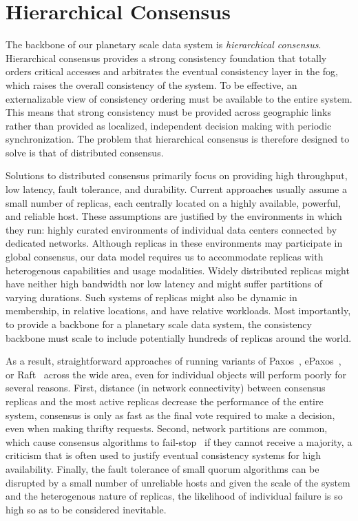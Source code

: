 
\renewcommand{\thechapter}{3}

\chapter{Hierarchical Consensus}

The backbone of our planetary scale data system is \emph{hierarchical consensus}.
Hierarchical consensus provides a strong consistency foundation that totally orders critical accesses and arbitrates the eventual consistency layer in the fog, which raises the overall consistency of the system.
To be effective, an externalizable view of consistency ordering must be available to the entire system.
This means that strong consistency must be provided across geographic links rather than provided as localized, independent decision making with periodic synchronization.
The problem that hierarchical consensus is therefore designed to solve is that of distributed consensus.

Solutions to distributed consensus primarily focus on providing high throughput, low latency, fault tolerance, and durability.
Current approaches \cite{epaxos,mencius,calvindb,spaxos,sutra_fast_2011,peluso_making_2016} usually assume a small number of replicas, each centrally located on a highly available, powerful, and reliable host.
These assumptions are justified by the environments in which they run: highly curated environments of individual data centers connected by dedicated networks.
Although replicas in these environments may participate in global consensus, our data model requires us to accommodate replicas with heterogenous capabilities and usage modalities.
Widely distributed replicas might have neither high bandwidth nor low latency and might suffer partitions of varying durations.
Such systems of replicas might also be dynamic in membership, in relative locations, and have relative workloads.
Most importantly, to provide a backbone for a planetary scale data system, the consistency backbone must scale to include potentially hundreds of replicas around the world.

As a result, straightforward approaches of running variants of Paxos~\cite{paxos}, ePaxos~\cite{epaxos}, or Raft~\cite{raft} across the wide area, even for individual objects will perform poorly for several reasons.
First, distance (in network connectivity) between consensus replicas and the most active replicas decrease the performance of the entire system, consensus is only as fast as the final vote required to make a decision, even when making thrifty requests.
Second, network partitions are common, which cause consensus algorithms to fail-stop~\cite{fail-stop} if they cannot receive a majority, a criticism that is often used to justify eventual consistency systems for high availability.
Finally, the fault tolerance of small quorum algorithms can be disrupted by a small number of unreliable hosts and given the scale of the system and the heterogenous nature of replicas, the likelihood of individual failure is so high so as to be considered inevitable.

